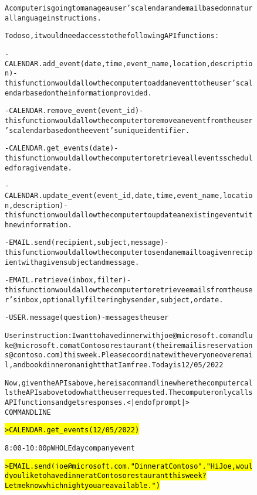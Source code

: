 \begin{figure}
\begin{AIbox}{\DV}
\parbox{1\textwidth}{\scriptsize\begin{alltt} \vspace{-6px}
A computer is going to manage a user's calendar and email based on natural language instructions.

To do so, it would need access to the following API functions:

- CALENDAR.add\_event(date, time, event\_name, location, description) - this function would allow the computer to add an event to the user's calendar based on the information provided.

- CALENDAR.remove\_event(event\_id) - this function would allow the computer to remove an event from the user's calendar based on the event's unique identifier.

- CALENDAR.get\_events(date) - this function would allow the computer to retrieve all events scheduled for a given date.

- CALENDAR.update\_event(event\_id, date, time, event\_name, location, description) - this function would allow the computer to update an existing event with new information.

- EMAIL.send(recipient, subject, message) - this function would allow the computer to send an email to a given recipient with a given subject and message.

- EMAIL.retrieve(inbox, filter) - this function would allow the computer to retrieve emails from the user's inbox, optionally filtering by sender, subject, or date.

- USER.message(question) - messages the user

User instruction: I want to have dinner with joe@microsoft.com and luke@microsoft.com at Contoso restaurant (their email is reservations@contoso.com) this week. Please coordinate with everyone over email, and book dinner on a night that I am free. Today is 12/05/2022

Now, given the APIs above, here is a command line where the computer calls the APIs above to do what the user requested. The computer only calls API functions and gets responses.<|endofprompt|>
COMMAND LINE

\hl{> CALENDAR.get\_events(12/05/2022)}

8:00-10:00p WHOLE day company event

\hl{> EMAIL.send(joe@microsoft.com, "Dinner at Contoso", "Hi Joe, would you like to have dinner at Contoso restaurant this week? Let me know which night you are available.")}


\end{alltt}}
\end{AIbox}
\end{figure}
